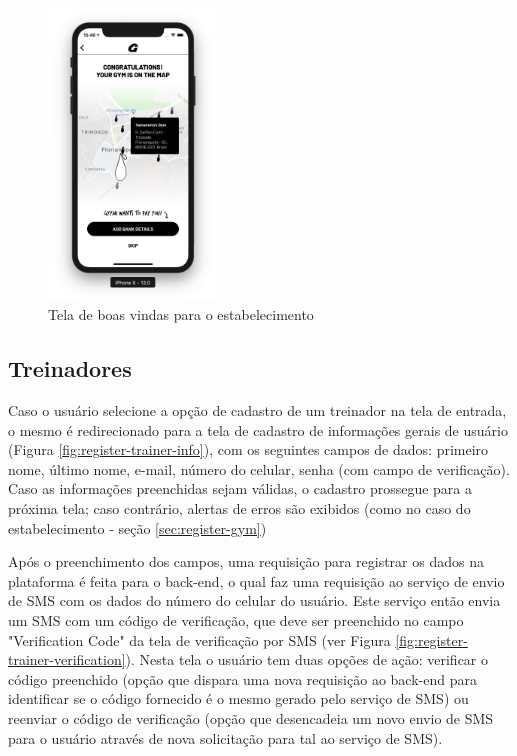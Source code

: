 \begin{figure}[H]
    \centering
    \includegraphics[width=0.4\textwidth]{pfc/figuras/gym-welcome.png}
    \caption{Tela de boas vindas para o estabelecimento}
    \label{fig:gym-welcome}
\end{figure}

\subsection{Treinadores}
Caso o usuário selecione a opção de cadastro de um treinador na tela de entrada, o mesmo é redirecionado para a tela de cadastro de informações gerais de usuário (Figura \ref{fig:register-trainer-info}), com os seguintes campos de dados: primeiro nome, último nome, e-mail, número do celular, senha (com campo de verificação). Caso as informações preenchidas sejam válidas, o cadastro prossegue para a próxima tela; caso contrário, alertas de erros são exibidos (como no caso do estabelecimento - seção \ref{sec:register-gym})

Após o preenchimento dos campos, uma requisição para registrar os dados na plataforma é feita para o back-end, o qual faz uma requisição ao serviço de envio de SMS com os dados do número do celular do usuário. Este serviço então envia um SMS com um código de verificação, que deve ser preenchido no campo "Verification Code" da tela de verificação por SMS (ver Figura \ref{fig:register-trainer-verification}). Nesta tela o usuário tem duas opções de ação: verificar o código preenchido (opção que dispara uma nova requisição ao back-end para identificar se o código fornecido é o mesmo gerado pelo serviço de SMS) ou reenviar o código de verificação (opção que desencadeia um novo envio de SMS para o usuário através de nova solicitação para tal ao serviço de SMS).

